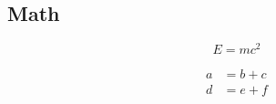 
\subsection{Math}

\begin{equation}
    E = mc^2
    \label{eq:einstein}
\end{equation}

\begin{align}
    a &= b + c \\
    d &= e + f
\end{align}
